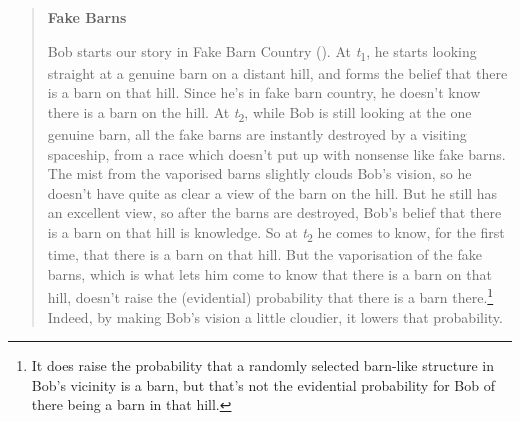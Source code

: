 \documentclass[
  11pt,
  letterpaper,
  DIV=11,
  numbers=noendperiod,
  twoside]{scrartcl}
\begin{document}
\begin{quote}
\textbf{Fake Barns}

Bob starts our story in Fake Barn Country
(). At
\emph{t}\textsubscript{1}, he starts looking straight at a genuine barn
on a distant hill, and forms the belief that there is a barn on that
hill. Since he's in fake barn country, he doesn't know there is a barn
on the hill. At \emph{t}\textsubscript{2}, while Bob is still looking at
the one genuine barn, all the fake barns are instantly destroyed by a
visiting spaceship, from a race which doesn't put up with nonsense like
fake barns. The mist from the vaporised barns slightly clouds Bob's
vision, so he doesn't have quite as clear a view of the barn on the
hill. But he still has an excellent view, so after the barns are
destroyed, Bob's belief that there is a barn on that hill is knowledge.
So at \emph{t}\textsubscript{2} he comes to know, for the first time,
that there is a barn on that hill. But the vaporisation of the fake
barns, which is what lets him come to know that there is a barn on that
hill, doesn't raise the (evidential) probability that there is a barn
there.\footnote{It does raise the probability that a randomly selected
  barn-like structure in Bob's vicinity is a barn, but that's not the
  evidential probability for Bob of there being a barn in that hill.}
Indeed, by making Bob's vision a little cloudier, it lowers that
probability.
\end{quote}
\end{document}
